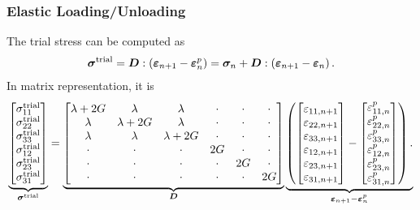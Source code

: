 \subsubsection{Elastic Loading/Unloading}
The trial stress can be computed as
\begin{gather}\label{eq:j2_tsigma}
    \bm{\sigma}^\text{trial}=\bm{D}:\left(\bm{\varepsilon}_{n+1}-\bm{\varepsilon}^p_n\right)=\bm{\sigma}_n+\bm{D}:\left(\bm{\varepsilon}_{n+1}-\bm{\varepsilon}_n\right).
\end{gather}
In matrix representation, it is
\begin{gather}
    \underbrace{
        \begin{bmatrix}
            \sigma^\text{trial}_{11} \\
            \sigma^\text{trial}_{22} \\
            \sigma^\text{trial}_{33} \\
            \sigma^\text{trial}_{12} \\
            \sigma^\text{trial}_{23} \\
            \sigma^\text{trial}_{31}
        \end{bmatrix}}_{\bm{\sigma}^\text{trial}}
    =
    \underbrace{\begin{bmatrix}
            \lambda+2G & \lambda    & \lambda    & \cdot & \cdot & \cdot \\
            \lambda    & \lambda+2G & \lambda    & \cdot & \cdot & \cdot \\
            \lambda    & \lambda    & \lambda+2G & \cdot & \cdot & \cdot \\
            \cdot      & \cdot      & \cdot      & 2G    & \cdot & \cdot \\
            \cdot      & \cdot      & \cdot      & \cdot & 2G    & \cdot \\
            \cdot      & \cdot      & \cdot      & \cdot & \cdot & 2G
        \end{bmatrix}}_{\bm{D}}
    \underbrace{\left(\begin{bmatrix}
            \varepsilon_{11,n+1} \\
            \varepsilon_{22,n+1} \\
            \varepsilon_{33,n+1} \\
            \varepsilon_{12,n+1} \\
            \varepsilon_{23,n+1} \\
            \varepsilon_{31,n+1}
        \end{bmatrix}-\begin{bmatrix}
            \varepsilon^p_{11,n} \\
            \varepsilon^p_{22,n} \\
            \varepsilon^p_{33,n} \\
            \varepsilon^p_{12,n} \\
            \varepsilon^p_{23,n} \\
            \varepsilon^p_{31,n}
        \end{bmatrix}
        \right).}_{\bm{\varepsilon}_{n+1}-\bm{\varepsilon}^p_n}
\end{gather}
